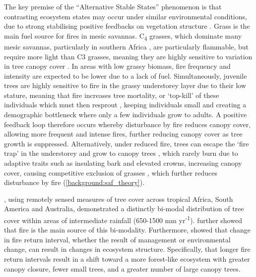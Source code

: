 \begin{refsection}
The key premise of the ``Alternative Stable States'' phenomenon is that contrasting ecosystem states may occur under similar environmental conditions, due to strong stabilising positive feedbacks on vegetation structure \citep{Staver2011}. Grass is the main fuel source for fires in mesic savannas. C\textsubscript{4} grasses, which dominate many mesic savannas, particularly in southern Africa \citep{Still2003}, are particularly flammable, but require more light than C3 grasses, meaning they are highly sensitive to variation in tree canopy cover \citep{CharlesDominique2018}. In areas with low grassy biomass, fire frequency and intensity are expected to be lower due to a lack of fuel. Simultaneously, juvenile trees are highly sensitive to fire in the grassy understorey layer due to their low stature, meaning that fire increases tree mortality, or `top-kill' of these individuals which must then resprout \citep{Ryan2011}, keeping individuals small and creating a demographic bottleneck where only a few individuals grow to adults. A positive feedback loop therefore occurs whereby disturbance by fire reduces canopy cover, allowing more frequent and intense fires, further reducing canopy cover as tree growth is suppressed. Alternatively, under reduced fire, trees can escape the `fire trap' in the understorey and grow to canopy trees \citep{Wakeling2011}, which rarely burn due to adaptive traits such as insulating bark and elevated crowns, increasing canopy cover, causing competitive exclusion of grasses \citep{Moustakas2013}, which further reduces disturbance by fire (\autoref{background:saf_theory}). 

\citet{Hirota2011}, using remotely sensed measures of tree cover across tropical Africa, South America and Australia, demonstrated a distinctly bi-modal distribution of tree cover within areas of intermediate rainfall (\textapprox{}650-1500 mm yr\textsuperscript{-1}). \citet{Staver2011} further showed that fire is the main source of this bi-modality. Furthermore, \citet{Staver2017} showed that change in fire return interval, whether the result of management or environmental change, can result in changes in ecosystem structure. Specifically, that longer fire return intervals result in a shift toward a more forest-like ecosystem with greater canopy closure, fewer small trees, and a greater number of large canopy trees.


\end{refsection}
